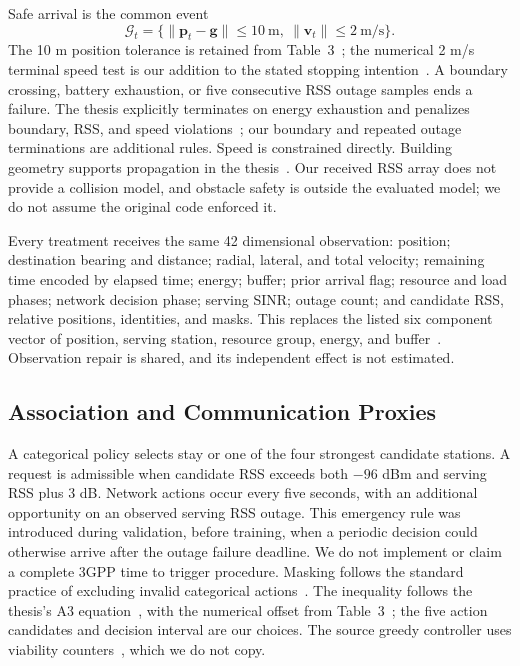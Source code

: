 \documentclass[conference]{IEEEtran}
\begin{document}
Safe arrival is the common event
\begin{equation}
\mathcal G_t=\{\|\mathbf p_t-\mathbf g\|\leq10\ \mathrm m,
                  \ \|\mathbf v_t\|\leq2\ \mathrm{m/s}\}.
\end{equation}
The 10 m position tolerance is retained from Table~3~\cite[p.~15]{thesis};
the numerical 2 m/s terminal speed test is our addition to the stated stopping
intention~\cite[p.~9, Sec.~3.2]{thesis}. A boundary crossing, battery exhaustion,
or five consecutive RSS outage samples ends a failure. The thesis explicitly
terminates on energy exhaustion and penalizes boundary, RSS, and speed
violations~\cite[p.~12, Sec.~5.2, Eq.~(14)]{thesis}; our boundary and repeated
outage terminations are additional rules. Speed is constrained directly.
Building geometry supports propagation in the thesis~\cite[p.~6, Sec.~3.1.1]{thesis}.
Our received RSS array does not provide a collision model, and obstacle safety
is outside the evaluated model; we do not assume the original code enforced it.

Every treatment receives the same 42 dimensional observation: position;
destination bearing and distance; radial, lateral, and total velocity;
remaining time encoded by elapsed time; energy; buffer; prior arrival flag;
resource and load phases; network decision phase; serving SINR; outage count;
and candidate RSS, relative positions, identities, and masks. This replaces
the listed six component vector of position, serving station, resource group,
energy, and buffer~\cite[p.~12, Sec.~5.2]{thesis}. Observation repair is shared,
and its independent effect is not estimated.

\subsection{Association and Communication Proxies}
A categorical policy selects stay or one of the four strongest candidate
stations. A request is admissible when candidate RSS exceeds both $-96$ dBm
and serving RSS plus 3 dB. Network actions occur every five seconds, with an
additional opportunity on an observed serving RSS outage. This emergency rule
was introduced during validation, before training, when a periodic decision
could otherwise arrive after the outage failure deadline. We do not implement
or claim a complete 3GPP time to trigger procedure. Masking follows the standard
practice of excluding invalid categorical actions~\cite{masking}.
The inequality follows the thesis's A3 equation~\cite[p.~9, Eq.~(3)]{thesis},
with the numerical offset from Table~3~\cite[p.~15]{thesis}; the five action
candidates and decision interval are our choices. The source greedy controller
uses viability counters~\cite[pp.~13--14, Sec.~5.4]{thesis}, which we do not copy.
\end{document}

